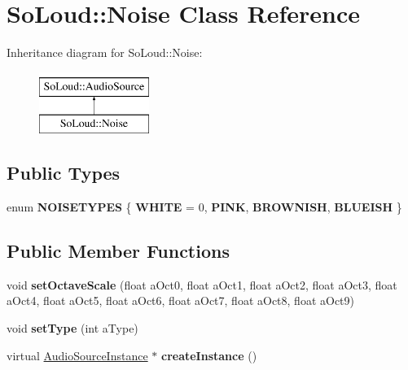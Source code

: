 \hypertarget{class_so_loud_1_1_noise}{}\section{So\+Loud\+::Noise Class Reference}
\label{class_so_loud_1_1_noise}
Inheritance diagram for So\+Loud\+::Noise\+:\begin{figure}[H]
\begin{center}
\leavevmode
\includegraphics[height=2.000000cm]{class_so_loud_1_1_noise}
\end{center}
\end{figure}
\subsection*{Public Types}
\begin{DoxyCompactItemize}
\item 
\mbox{\label{class_so_loud_1_1_noise_aa2f9e89391f2b286cfcd4d6cbbebb705}} 
enum {\bfseries N\+O\+I\+S\+E\+T\+Y\+P\+ES} \{ {\bfseries W\+H\+I\+TE} = 0, 
{\bfseries P\+I\+NK}, 
{\bfseries B\+R\+O\+W\+N\+I\+SH}, 
{\bfseries B\+L\+U\+E\+I\+SH}
 \}
\end{DoxyCompactItemize}
\subsection*{Public Member Functions}
\begin{DoxyCompactItemize}
\item 
\mbox{\label{class_so_loud_1_1_noise_ae93619e29c7817c95068a29d5aa108b3}} 
void {\bfseries set\+Octave\+Scale} (float a\+Oct0, float a\+Oct1, float a\+Oct2, float a\+Oct3, float a\+Oct4, float a\+Oct5, float a\+Oct6, float a\+Oct7, float a\+Oct8, float a\+Oct9)
\item 
\mbox{\label{class_so_loud_1_1_noise_a527f3388416d8d4d337d16d99d55204a}} 
void {\bfseries set\+Type} (int a\+Type)
\item 
\mbox{\label{class_so_loud_1_1_noise_abb1ad913317950877a3ee2748cb4aff1}} 
virtual \mbox{\hyperlink{class_so_loud_1_1_audio_source_instance}{Audio\+Source\+Instance}} $\ast$ {\bfseries create\+Instance} ()
\end{DoxyCompactItemize}

